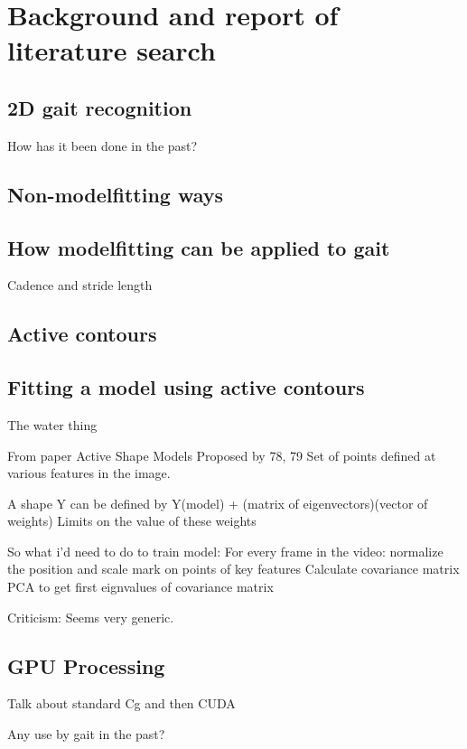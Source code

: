 \section{Background and report of literature search}

\subsection{2D gait recognition}

How has it been done in the past?

\subsection{Non-modelfitting ways}

\subsection{How modelfitting can be applied to gait}

Cadence and stride length \cite{GaitBook}

\subsection{Active contours}\label{ContourBackground}

\subsection{Fitting a model using active contours}

The water thing

From paper \cite{ImageSegModels}
Active Shape Models  Proposed by 78, 79
Set of points defined at various features in the image.

A shape Y can be defined by Y(model) + (matrix of eigenvectors)(vector of weights)
Limits on the value of these weights

So what i'd need to do to train model:
For every frame in the video:
  normalize the position and scale
  mark on points of key features
Calculate covariance matrix
PCA to get first eignvalues of covariance matrix

Criticism:
Seems very generic.

\subsection{GPU Processing}

Talk about standard Cg and then CUDA

Any use by gait in the past?
